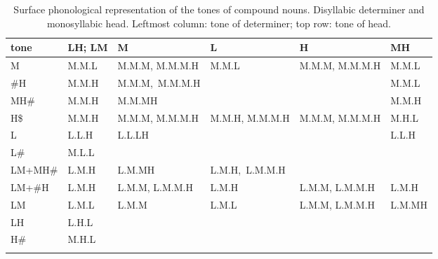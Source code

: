 \begin{subtables}
\begin{table}%
\caption{\label{tab:surfacemonosyllabicdisyllables}Surface phonological representation of the tones of
  compound nouns. Disyllabic determiner and monosyllabic head. Leftmost column: tone of determiner; top row: tone of head.}
{\renewcommand{\arraystretch}{1.2}
\begin{tabularx}{\textwidth}{ l Q Q Q P{21mm} Q }
\lsptoprule
	tone & LH; LM & M & L & H & MH\\ \midrule
	M & M.M.L & M.M.M, M.M.M.H & M.M.L & M.M.M, M.M.M.H & M.M.L\\
	\#H & M.M.H & \hbox{M.M.M, M.M.M.H} &  & \hspace*{\fill} & M.M.L\\
	MH\# & M.M.H & M.M.MH &  &  \hspace*{\fill} & M.M.H\\
	H\$ & M.M.H & M.M.M, M.M.M.H & M.M.H, M.M.M.H & M.M.M, M.M.M.H & M.H.L\\
	L & L.L.H & L.L.LH &  & \hspace*{\fill} & L.L.H\\
	L\# & M.L.L &  &  &  &  \hspace*{\fill}\\
	LM+MH\# & L.M.H & L.M.MH & \hbox{L.M.H, L.M.M.H} & & \hspace*{\fill}\\
	LM+\#H & L.M.H & L.M.M, L.M.M.H & L.M.H & L.M.M, L.M.M.H & L.M.H\\
	LM & L.M.L & L.M.M & L.M.L & L.M.M, L.M.M.H & L.M.MH\\
	LH & L.H.L &  &  &  & \hspace*{\fill}\\
	H\# & M.H.L &  &  &  &  \hspace*{\fill}\\
\lspbottomrule
\end{tabularx}}
\end{table}



\end{subtables}
